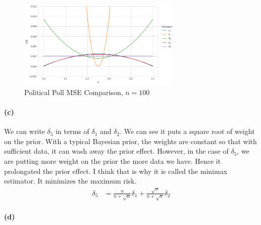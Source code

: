 \documentclass[11pt, letterpaper]{article}
\begin{document}
\begin{figure}[!h]
  \centering
  \includegraphics[width=0.7\textwidth]{3.b.2.png}
  \captionsetup{justification=centering}
  \caption{Political Poll MSE Comparison, $n = 100$}
\end{figure}

\paragraph{(c)}
We can write $\delta_5$ in terms of $\delta_1$ and $\delta_2$. We can see it puts a square root of weight on the prior. With a typical Bayesian prior, the weights are constant so that with sufficient data, it can wash away the prior effect. However, in the case of $\delta_5$, we are putting more weight on the prior the more data we have. Hence it prolongated the prior effect. I think that is why it is called the minimax estimator. It minimizes the maximum risk.
\begin{align*}
    \delta_5 &= \frac{n}{n + \sqrt{n}} \delta_1 + \frac{\sqrt{n}}{n+\sqrt{n}} \delta_2
\end{align*}

\paragraph{(d)}
\end{document}
